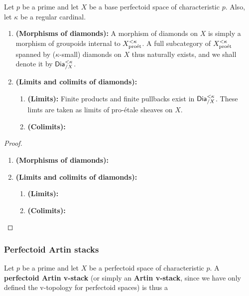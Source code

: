                 \begin{proposition} \label{prop: categories_of_diamonds}
                    Let $p$ be a prime and let $X$ be a base perfectoid space of characteristic $p$. Also, let $\kappa$ be a regular cardinal.
                        \begin{enumerate}
                            \item \textbf{(Morphisms of diamonds):} A morphism of diamonds on $X$ is simply a morphism of groupoids internal to $X_{\mathrm{pro\acute{e}t}}^{< \kappa}$. A full subcategory of $X_{\mathrm{pro\acute{e}t}}^{< \kappa}$ spanned by ($\kappa$-small) diamonds on $X$ thus naturally exists, and we shall denote it by $\mathsf{Dia}_{/X}^{< \kappa}$. 
                            \item \textbf{(Limits and colimits of diamonds):}
                                \begin{enumerate}
                                    \item \textbf{(Limits):} Finite products and finite pullbacks exist in $\mathsf{Dia}_{/X}^{< \kappa}$. These limts are taken as limits of pro-\'etale sheaves on $X$. 
                                    \item \textbf{(Colimits):} 
                                \end{enumerate}
                        \end{enumerate}
                \end{proposition}
                    \begin{proof}
                        \noindent
                        \begin{enumerate}
                            \item \textbf{(Morphisms of diamonds):}
                            \item \textbf{(Limits and colimits of diamonds):}
                                \begin{enumerate}
                                    \item \textbf{(Limits):}
                                    \item \textbf{(Colimits):}
                                \end{enumerate}
                        \end{enumerate}
                    \end{proof}
            
            \subsubsection{Perfectoid Artin stacks}
                \begin{definition} \label{def: perfectoid_artin_stacks} 
                    Let $p$ be a prime and let $X$ be a perfectoid space of characteristic $p$. A \textbf{perfectoid Artin v-stack} (or simply an \textbf{Artin v-stack}, since we have only defined the v-topology for perfectoid spaces) is thus a 
                \end{definition}
            
